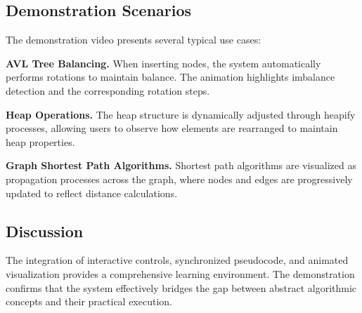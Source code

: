 \subsection{Demonstration Scenarios}

The demonstration video presents several typical use cases:

\textbf{AVL Tree Balancing.}
When inserting nodes, the system automatically performs rotations to maintain balance. The animation highlights imbalance detection and the corresponding rotation steps.

\textbf{Heap Operations.}
The heap structure is dynamically adjusted through heapify processes, allowing users to observe how elements are rearranged to maintain heap properties.

\textbf{Graph Shortest Path Algorithms.}
Shortest path algorithms are visualized as propagation processes across the graph, where nodes and edges are progressively updated to reflect distance calculations.

\subsection{Discussion}

The integration of interactive controls, synchronized pseudocode, and animated visualization provides a comprehensive learning environment. The demonstration confirms that the system effectively bridges the gap between abstract algorithmic concepts and their practical execution.
